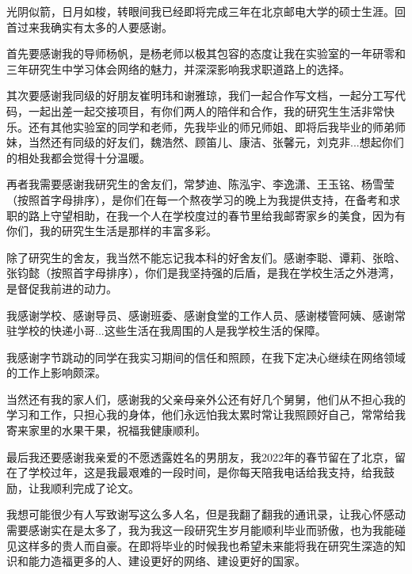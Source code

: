 
\begin{acknowledgement}
  光阴似箭，日月如梭，转眼间我已经即将完成三年在北京邮电大学的硕士生涯。回首过来我确实有太多的人要感谢。

  首先要感谢我的导师杨帆，是杨老师以极其包容的态度让我在实验室的一年研零和三年研究生中学习体会网络的魅力，并深深影响我求职道路上的选择。

  其次要感谢我同级的好朋友崔明玮和谢雅琼，我们一起合作写文档，一起分工写代码，一起出差一起交接项目，有你们两人的陪伴和合作，我的研究生生活非常快乐。还有其他实验室的同学和老师，先我毕业的师兄师姐、即将后我毕业的师弟师妹，当然还有同级的好友们，魏浩然、顾笛儿、康洁、张馨元，刘克非...想起你们的相处我都会觉得十分温暖。

  再者我需要感谢我研究生的舍友们，常梦迪、陈泓宇、李逸潇、王玉铭、杨雪莹（按照首字母排序），是你们在每一个熬夜学习的晚上为我提供支持，在备考和求职的路上守望相助，在我一个人在学校度过的春节里给我邮寄家乡的美食，因为有你们，我的研究生生活是那样的丰富多彩。

  除了研究生的舍友，我当然不能忘记我本科的好舍友们。感谢李聪、谭莉、张晗、张钧懿（按照首字母排序），你们是我坚持强的后盾，是我在学校生活之外港湾，是督促我前进的动力。

  我感谢学校、感谢导员、感谢班委、感谢食堂的工作人员、感谢楼管阿姨、感谢常驻学校的快递小哥...这些生活在我周围的人是我学校生活的保障。
  
  我感谢字节跳动的同学在我实习期间的信任和照顾，在我下定决心继续在网络领域的工作上影响颇深。

  当然还有我的家人们，感谢我的父亲母亲外公还有好几个舅舅，他们从不担心我的学习和工作，只担心我的身体，他们永远怕我太累时常让我照顾好自己，常常给我寄来家里的水果干果，祝福我健康顺利。

  最后我还要感谢我亲爱的不愿透露姓名的男朋友，我2022年的春节留在了北京，留在了学校过年，这是我最艰难的一段时间，是你每天陪我电话给我支持，给我鼓励，让我顺利完成了论文。

  我想可能很少有人写致谢写这么多人名，但是我翻了翻我的通讯录，让我心怀感动需要感谢实在是太多了，我为我这一段研究生岁月能顺利毕业而骄傲，也为我能碰见这样多的贵人而自豪。在即将毕业的时候我也希望未来能将我在研究生深造的知识和能力造福更多的人、建设更好的网络、建设更好的国家。

\end{acknowledgement}
